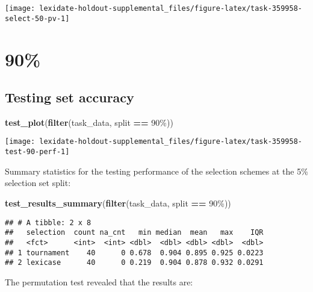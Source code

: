 \documentclass[
]{book}
\newenvironment{Shaded}{\begin{snugshade}}{\end{snugshade}}
\newcommand{\FunctionTok}[1]{\textcolor[rgb]{0.13,0.29,0.53}{\textbf{#1}}}
\newcommand{\NormalTok}[1]{#1}
\newcommand{\SpecialCharTok}[1]{\textcolor[rgb]{0.81,0.36,0.00}{\textbf{#1}}}
\newcommand{\StringTok}[1]{\textcolor[rgb]{0.31,0.60,0.02}{#1}}
\begin{document}
\texttt{[image: lexidate-holdout-supplemental\_files/figure-latex/task-359958-select-50-pv-1]}

\hypertarget{section-33}{%
\section{90\%}\label{section-33}}

\hypertarget{testing-set-accuracy-33}{%
\subsection{Testing set accuracy}\label{testing-set-accuracy-33}}

\begin{Shaded}
\begin{Highlighting}[]
\FunctionTok{test\_plot}\NormalTok{(}\FunctionTok{filter}\NormalTok{(task\_data, split }\SpecialCharTok{==} \StringTok{\textquotesingle{}90\%\textquotesingle{}}\NormalTok{))}
\end{Highlighting}
\end{Shaded}

\texttt{[image: lexidate-holdout-supplemental\_files/figure-latex/task-359958-test-90-perf-1]}

Summary statistics for the testing performance of the selection schemes at the 5\% selection set split:

\begin{Shaded}
\begin{Highlighting}[]
\FunctionTok{test\_results\_summary}\NormalTok{(}\FunctionTok{filter}\NormalTok{(task\_data, split }\SpecialCharTok{==} \StringTok{\textquotesingle{}90\%\textquotesingle{}}\NormalTok{))}
\end{Highlighting}
\end{Shaded}

\begin{verbatim}
## # A tibble: 2 x 8
##   selection  count na_cnt   min median  mean   max    IQR
##   <fct>      <int>  <int> <dbl>  <dbl> <dbl> <dbl>  <dbl>
## 1 tournament    40      0 0.678  0.904 0.895 0.925 0.0223
## 2 lexicase      40      0 0.219  0.904 0.878 0.932 0.0291
\end{verbatim}

The permutation test revealed that the results are:
\end{document}
